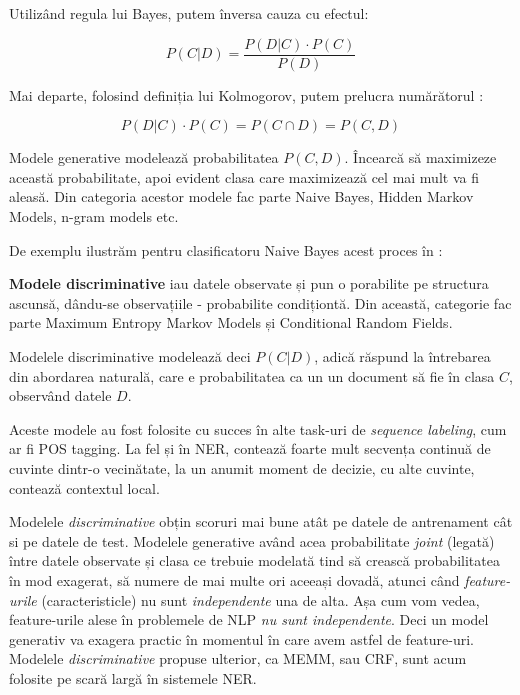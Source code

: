 Utilizând regula lui Bayes, putem înversa cauza cu efectul:



\begin{equation}
\label{eq:bayes-rule}
P(C|D) = \frac{P(D|C) \cdot P(C)}{P(D)}
\end{equation}

Mai departe, folosind definiția lui Kolmogorov, putem prelucra numărătorul :


\begin{equation}
P(D|C) \cdot P(C) = P(C\cap D) = P(C,D)
\end{equation}


Modele generative modelează probabilitatea $P(C,D)$. Încearcă să maximizeze această probabilitate, apoi evident clasa care maximizează cel mai mult va fi aleasă. Din categoria acestor modele fac parte Naive Bayes, Hidden Markov Models, n-gram models etc.

De exemplu ilustrăm pentru clasificatoru Naive Bayes acest proces în :



\textbf{Modele discriminative} iau datele observate și pun o porabilite pe structura ascunsă, dându-se observațiile - probabilite condiționtă. Din această, categorie fac parte Maximum Entropy Markov Models și Conditional Random Fields.\cite{Mccallum00maximumentropy}\cite{Lafferty01conditionalrandom}

Modelele discriminative modelează deci $P(C|D)$, adică răspund la întrebarea din abordarea naturală, care e probabilitatea ca un un document să fie în clasa $C$, observând datele $D$.


Aceste modele au fost folosite cu succes în alte task-uri de \textit{sequence labeling}, cum ar fi POS tagging. La fel și în NER, contează foarte mult secvența continuă de cuvinte dintr-o vecinătate, la un anumit moment de decizie, cu alte cuvinte, contează contextul local.

Modelele \textit{discriminative} obțin scoruri mai bune atât pe datele de antrenament cât si pe datele de test. Modelele generative având acea probabilitate \textit{joint} (legată) între datele observate și clasa ce trebuie modelată tind să crească probabilitatea în mod exagerat, să numere de mai multe ori aceeași dovadă, atunci când \textit{feature-urile} (caracteristicle) nu sunt \textit{independente} una de alta. Așa cum vom vedea, feature-urile alese în problemele de NLP \textit{nu sunt independente}. Deci un model generativ va exagera practic în momentul în care avem astfel de feature-uri. Modelele \textit{discriminative} propuse ulterior, ca MEMM, sau CRF, sunt acum folosite pe scară largă în sistemele NER.

